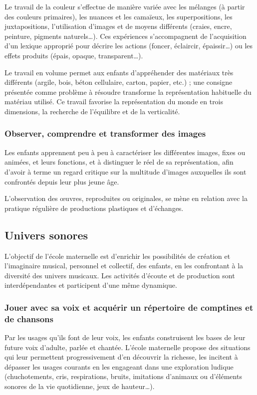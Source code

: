 Le travail de la couleur s’effectue de manière variée avec les mélanges (à partir des couleurs primaires), les nuances et les camaïeux, les superpositions, les juxtapositions, l’utilisation d’images et de moyens différents (craies, encre, peinture, pigments naturels\dots). Ces expériences s'accompagnent de l'acquisition d'un lexique approprié pour décrire les actions (foncer, éclaircir, épaissir\dots) ou les effets produits (épais, opaque, transparent\dots).

Le travail en volume permet aux enfants d’appréhender des matériaux très différents (argile, bois, béton cellulaire, carton, papier, etc.) ; une consigne présentée comme problème à résoudre transforme la représentation habituelle du matériau utilisé. Ce travail favorise la représentation du monde en trois dimensions, la recherche de l’équilibre et de la verticalité. 

\subsubsection{Observer, comprendre et transformer des images}
Les enfants apprennent peu à peu à caractériser les différentes images, fixes ou animées, et leurs fonctions, et à distinguer le réel de sa représentation, afin d’avoir à terme un regard critique sur la multitude d’images auxquelles ils sont confrontés depuis leur plus jeune âge. 

L’observation des œuvres, reproduites ou originales, se mène en relation avec la pratique régulière de productions plastiques et d’échanges. 

\subsection{Univers sonores}
L'objectif de l'école maternelle est d'enrichir les possibilités de création et l'imaginaire musical, personnel et collectif, des enfants, en les confrontant à la diversité des univers musicaux. Les activités d'écoute et de production sont interdépendantes et participent d’une même dynamique. 

\subsubsection{Jouer avec sa voix et acquérir un répertoire de comptines et de chansons}
Par les usages qu'ils font de leur voix, les enfants construisent les bases de leur future voix d'adulte, parlée et chantée. L'école maternelle propose des situations qui leur permettent progressivement d'en découvrir la richesse, les incitent à dépasser les usages courants en les engageant dans une exploration ludique (chuchotements, cris, respirations, bruits, imitations d'animaux ou d'éléments sonores de la vie quotidienne, jeux de hauteur\dots). 

